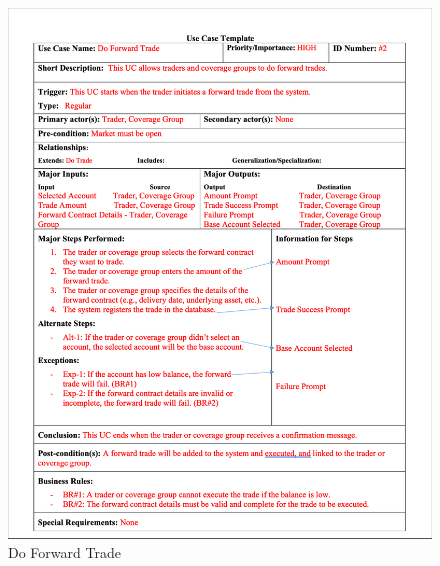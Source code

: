 \documentclass[a4paper]{report}
\begin{document}
\begin{figure}[h!]
    \centering
    \includegraphics[width=\textwidth]{images/uc/2-do-forward-trade.png}
    \caption{Do Forward Trade}
    \label{fig:2-do-forward-trade}
\end{figure}
\end{document}
